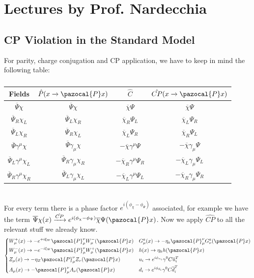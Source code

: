 \documentclass[../main.tex]{subfiles}
\begin{document}
\setchapterpreamble[u]{\margintoc}
\chapter[Lectures by Prof. Nardecchia]{Lectures by Prof. Nardecchia\footnotemark[0]}
\section{CP Violation in the Standard Model}
For parity, charge conjugation and CP application, we have to keep in mind the following table:
\begin{table}[h]
    \centering
    {\renewcommand{\arraystretch}{1}
    \begin{tabular}{c|c|c|c}
    \hline
    \rowcolor{blue!30}Fields & $\hat{P}(x\xrightarrow[]{}\pazocal{P}x)$ & $\hat{C}$ & $\hat{CP}(x\xrightarrow[]{}\pazocal{P}x)$\\
    \hline
    $\overline{\Psi}\chi$ & $\overline{\Psi}\chi$ & $\overline{\chi}\Psi$ & $\overline{\chi}\Psi$\\
    $\overline{\Psi}_R\chi_L$ & $\overline{\Psi}_L\chi_R$ & $\overline{\chi}_R\Psi_L$ & $\overline{\chi}_L\Psi_R$\\
    $\overline{\Psi}_L\chi_R$ & $\overline{\Psi}_R\chi_L$ & $\overline{\chi}_L\Psi_R$ & $\overline{\chi}_R\Psi_L$\\
    $\overline{\Psi}\gamma^\mu\chi$ & $\overline{\Psi}\gamma_\mu\chi$ & $-\overline{\chi}\gamma^\mu\Psi$ & $-\overline{\chi}\gamma_\mu\Psi$ \\
    $\overline{\Psi}_L\gamma^\mu\chi_L$ & $\overline{\Psi}_R\gamma_\mu\chi_R$ & $-\overline{\chi}_R\gamma^\mu\Psi_R$ & $-\overline{\chi}_L\gamma_\mu\Psi_L$\\
    $\overline{\Psi}_R\gamma^\mu\chi_R$ & $\overline{\Psi}_L\gamma_\mu\chi_L$ & $-\overline{\chi}_L\gamma^\mu\Psi_L$ & $-\overline{\chi}_R\gamma_\mu\Psi_R$\\
    \hline
    \end{tabular}
    }
    \caption*{}
\end{table}\\
For every term there is a phase factor $e^{i(\phi_\chi-\phi_\Psi)}$ associated, for example we have the term $\overline{\Psi}\chi(x)\xrightarrow[]{\hat{CP}}e^{i(\phi_\chi-\phi_\Psi)}\overline{\chi}\Psi(\pazocal{P}x)$. Now we apply $\hat{CP}$ to all the relevant stuff we already know.
\[
\left\{
\begin{aligned}
&W_\mu^+(x)\to-e^{+i\xi_W}\pazocal{P}_\mu^\nu W_\mu^-(\pazocal{P}x)
&&G_\mu^a(x)\to-\eta_a\pazocal{P}_\mu^\nu G_\nu^a(\pazocal{P}x)\\   
&W_\mu^-(x)\to-e^{-i\xi_W}\pazocal{P}_\mu^\nu W_\mu^+(\pazocal{P}x) &&h(x)\to\eta_h h(\pazocal{P}x)\\
&Z_\mu(x)\to-\eta_Z\pazocal{P}_\mu^\nu Z_\nu(\pazocal{P}x) &&u_i\to e^{i\phi_{u_i}}\gamma^0C\overline{u}_i^T\\
&A_\mu(x)\to-\pazocal{P}_\mu^\nu A_\nu(\pazocal{P}x) &&d_i\to e^{i\phi_{d_i}}\gamma^0C\overline{d}_i^T
\end{aligned}
\right.
\]
\end{document}
